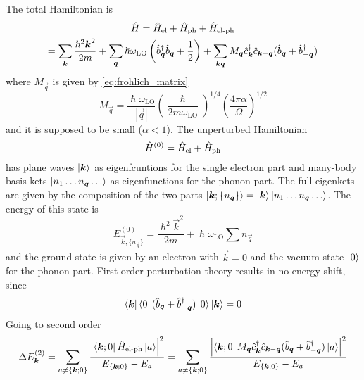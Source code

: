 The total Hamiltonian is
\begin{multline}
    \hat{H} = \hat{H}_\text{el} + \hat{H}_\text{ph} + \hat{H}_\text{el-ph}
    \\ = \sum_{\mathbf{\boldsymbol{k}}} \frac{\hslash^2\mathbf{\boldsymbol{k}}^2}{2m}
    + \sum_{\mathbf{\boldsymbol{q}}} \hslash \omega_\text{LO} \left( \hat{b}^\dagger_{ \mathbf{\boldsymbol{q}}} \hat{b}_{ \mathbf{\boldsymbol{q}}} + \frac{1}{2} \right)
    + \sum_{\mathbf{\boldsymbol{k}}\mathbf{\boldsymbol{q}}} M_{\mathbf{\boldsymbol{q}}}\hat{c}^\dagger_{\mathbf{\boldsymbol{k}}}\hat{c}_{\mathbf{\boldsymbol{k}}-\mathbf{\boldsymbol{q}}} (\hat{b}_{\mathbf{\boldsymbol{q}}} + \hat{b}^\dagger_{-\mathbf{\boldsymbol{q}}})
\end{multline}
where $M_\vec{q}$ is given by \cref{eq:frohlich_matrix}
\begin{equation} \label{eq:frohlich_matrix_perturbation}
    M_\vec{q} =  \frac{\hslash \omega_\text{LO}}{|\vec{q}|} \left(\frac{\hslash}{2m\omega_\text{LO}}\right)^{1/4} \left(\frac{4\pi\alpha}{\Omega}\right)^{1/2}
\end{equation}
and it is supposed to be small ($\alpha < 1$). The unperturbed Hamiltonian
\begin{equation}
    \hat{H}^{(0)} = \hat{H}_\text{el} + \hat{H}_\text{ph}
\end{equation}
has plane waves $\ket{\mathbf{\boldsymbol{k}}}$ as eigenfcuntions for the single  electron part and many-body basis kets $\ket{n_1 \dots n_{\mathbf{\boldsymbol{q}}} \dots}$ as eigenfunctions for the phonon part. The full eigenkets are given by the composition of the two parts $\ket{\mathbf{\boldsymbol{k}}; \{n_{\mathbf{\boldsymbol{q}}}\}} = \ket{\mathbf{\boldsymbol{k}}}\ket{n_1 \dots n_{\mathbf{\boldsymbol{q}}} \dots}$. The energy of this state is
\begin{equation}
    E_{\vec{k}, \{n_\vec{q}\}}^{(0)} = \frac{\hslash^2\vec{k}^2}{2m} + \hslash \omega_\text{LO}\sum n_\vec{q}
\end{equation}
and the ground state is given by an electron with $\vec{k}=0$ and the vacuum state $\ket{0}$ for the phonon part.
First-order perturbation theory results in no energy shift, since
\begin{equation}
    \bra{\mathbf{\boldsymbol{k}}}\bra{0}(\hat{b}_{\mathbf{\boldsymbol{q}}} + \hat{b}^\dagger_{-\mathbf{\boldsymbol{q}}})\ket{0}\ket{\mathbf{\boldsymbol{k}}} = 0
\end{equation}
Going to second order
\begin{equation}
    \Delta E_{\mathbf{\boldsymbol{k}}}^{(2)} = \sum_{a\neq{\{\mathbf{\boldsymbol{k}};0\}}} \frac{\left|\bra{\mathbf{\boldsymbol{k}};0}\hat{H}_\text{el-ph}\ket{a}\right|^2}{E_{\{\mathbf{\boldsymbol{k}};0\}} - E_a}
    = \sum_{a\neq{\{\mathbf{\boldsymbol{k}};0\}}} \frac{\left|\bra{\mathbf{\boldsymbol{k}};0} M_{\mathbf{\boldsymbol{q}}}\hat{c}^\dagger_{\mathbf{\boldsymbol{k}}}\hat{c}_{\mathbf{\boldsymbol{k}}-\mathbf{\boldsymbol{q}}} (\hat{b}_{\mathbf{\boldsymbol{q}}} + \hat{b}^\dagger_{-\mathbf{\boldsymbol{q}}})\ket{a}\right|^2}{E_{\{\mathbf{\boldsymbol{k}};0\}} - E_a}
\end{equation}

